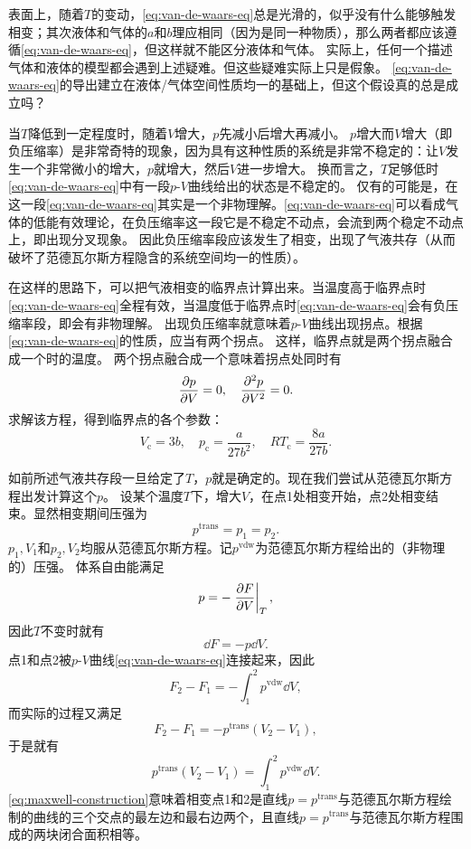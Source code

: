 \documentclass[hyperref, UTF8, a4paper]{ctexart}
\begin{document}
表面上，随着$T$的变动，\eqref{eq:van-de-waars-eq}总是光滑的，似乎没有什么能够触发相变；其次液体和气体的$a$和$b$理应相同（因为是同一种物质），那么两者都应该遵循\eqref{eq:van-de-waars-eq}，但这样就不能区分液体和气体。
实际上，任何一个描述气体和液体的模型都会遇到上述疑难。但这些疑难实际上只是假象。
\eqref{eq:van-de-waars-eq}的导出建立在液体/气体空间性质均一的基础上，但这个假设真的总是成立吗？

当$T$降低到一定程度时，随着$V$增大，$p$先减小后增大再减小。
$p$增大而$V$增大（即负压缩率）是非常奇特的现象，因为具有这种性质的系统是非常不稳定的：让$V$发生一个非常微小的增大，$p$就增大，然后$V$进一步增大。
换而言之，$T$足够低时\eqref{eq:van-de-waars-eq}中有一段$p$-$V$曲线给出的状态是不稳定的。
仅有的可能是，在这一段\eqref{eq:van-de-waars-eq}其实是一个非物理解。\eqref{eq:van-de-waars-eq}可以看成气体的低能有效理论，在负压缩率这一段它是不稳定不动点，会流到两个稳定不动点上，即出现分叉现象。
因此负压缩率段应该发生了相变，出现了气液共存（从而破坏了范德瓦尔斯方程隐含的系统空间均一的性质）。

在这样的思路下，可以把气液相变的临界点计算出来。当温度高于临界点时\eqref{eq:van-de-waars-eq}全程有效，当温度低于临界点时\eqref{eq:van-de-waars-eq}会有负压缩率段，即会有非物理解。
出现负压缩率就意味着$p$-$V$曲线出现拐点。根据\eqref{eq:van-de-waars-eq}的性质，应当有两个拐点。
这样，临界点就是两个拐点融合成一个时的温度。
两个拐点融合成一个意味着拐点处同时有
\[
    \pdv{p}{V} = 0, \quad \pdv[2]{p}{V} = 0.
\]
求解该方程，得到临界点的各个参数：
\begin{equation}
    V_\text{c} = 3b, \quad p_\text{c} = \frac{a}{27b^2}, \quad RT_\text{c} = \frac{8a}{27b}.
\end{equation}

如前所述气液共存段一旦给定了$T$，$p$就是确定的。现在我们尝试从范德瓦尔斯方程出发计算这个$p$。
设某个温度$T$下，增大$V$，在点1处相变开始，点2处相变结束。显然相变期间压强为
\[
    p^\text{trans} = p_1 = p_2.
\]
$p_1, V_1$和$p_2, V_2$均服从范德瓦尔斯方程。记$p^\text{vdw}$为范德瓦尔斯方程给出的（非物理的）压强。
体系自由能满足
\[
    p = - \eval{\pdv{F}{V}}_T,
\]
因此$T$不变时就有
\[
    \dd{F} = - p \dd{V}.
\]
点1和点2被$p$-$V$曲线\eqref{eq:van-de-waars-eq}连接起来，因此
\[
    F_2 - F_1 = - \int_1^2 p^\text{vdw} \dd{V},
\]
而实际的过程又满足
\[
    F_2 - F_1 = - p^\text{trans} (V_2 - V_1),
\]
于是就有
\begin{equation}
    p^\text{trans} (V_2 - V_1) = \int_1^2 p^\text{vdw} \dd{V}.
    \label{eq:maxwell-construction}
\end{equation}
\eqref{eq:maxwell-construction}意味着相变点1和2是直线$p=p^\text{trans}$与范德瓦尔斯方程绘制的曲线的三个交点的最左边和最右边两个，且直线$p=p^\text{trans}$与范德瓦尔斯方程围成的两块闭合面积相等。
\end{document}

